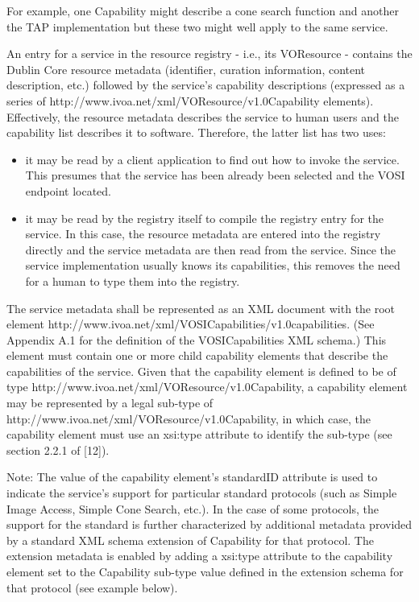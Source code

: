 \documentclass[11pt,letter]{ivoa}
\begin{document}
For example, one Capability might describe a cone search function and another the TAP implementation but these two might well apply to the same service.

An entry for a service in the resource registry - i.e., its VOResource - contains the Dublin Core resource metadata (identifier, curation information, content description, etc.) followed by the service's capability descriptions (expressed as a series of {http://www.ivoa.net/xml/VOResource/v1.0}Capability elements). Effectively, the resource metadata describes the service to human users and the capability list describes it to software. Therefore, the latter list has two uses:

\begin{itemize}
\item it may be read by a client application to find out how to invoke the service. This presumes that the service has been already been selected and the VOSI endpoint located.
\item it may be read by the registry itself to compile the registry entry for the service. In this case, the resource metadata are entered into the registry directly and the service metadata are then read from the service. Since the service implementation usually knows its capabilities, this removes the need for a human to type them into the registry. 
\end{itemize}

The service metadata shall be represented as an XML document with the root element {http://www.ivoa.net/xml/VOSICapabilities/v1.0}capabilities. (See Appendix A.1 for the definition of the VOSICapabilities XML schema.) This element must contain one or more child capability elements that describe the capabilities of the service. Given that the capability element is defined to be of type {http://www.ivoa.net/xml/VOResource/v1.0}Capability, a capability element may be represented by a legal sub-type of 
{http://www.ivoa.net/xml/VOResource/v1.0}Capability, in which case, the capability element must use an xsi:type attribute to identify the sub-type (see section 2.2.1 of [12]). 


Note:
    The value of the capability element's standardID attribute is used to indicate the service's support for particular standard protocols (such as Simple Image Access, Simple Cone Search, etc.). In the case of some protocols, the support for the standard is further characterized by additional metadata provided by a standard XML schema extension of Capability for that protocol. The extension metadata is enabled by adding a xsi:type attribute to the capability element set to the Capability sub-type value defined in the extension schema for that protocol (see example below). 
    
\end{document}
